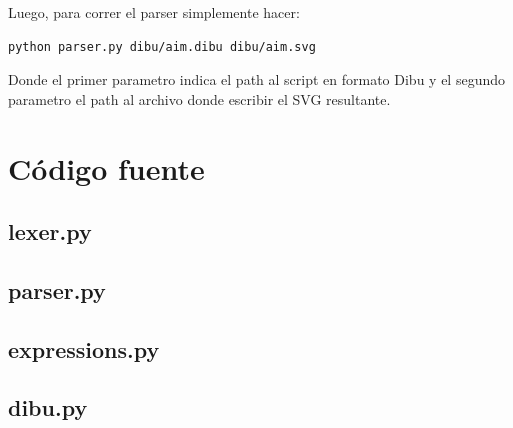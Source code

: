 \documentclass{article}
\theoremstyle{definition}
\theoremstyle{remark}
\begin{document}
Luego, para correr el parser simplemente hacer:
\begin{verbatim}
python parser.py dibu/aim.dibu dibu/aim.svg
\end{verbatim}

Donde el primer parametro indica el path al script en formato Dibu y el segundo parametro el path al archivo donde escribir el SVG resultante.

%

\pagebreak

\section{Código fuente}

\subsection{lexer.py}


\subsection{parser.py}
\begin{small}
  
\end{small}
\subsection{expressions.py}
\begin{small}
  
\end{small}

\subsection{dibu.py}
\begin{small}
  
\end{small}
\end{document}
